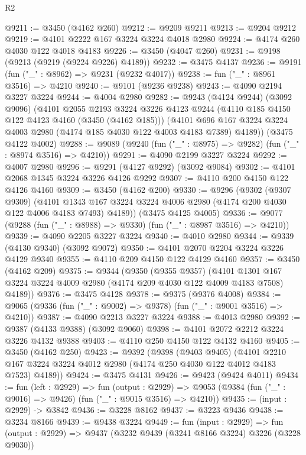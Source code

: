 \begin{lexlean}{R2}
\begin{coremodule}
@9211 := @3450 (@4162 @260)
@9212 := @9209 @9211
@9213 := @9204 @9212
@9219 := @4101 @2222 @167 @3224 @3224 @4018 @2980
@9224 := @4174 @260 @4030 @122 @4018 @4183
@9226 := @3450 (@4047 @260)
@9231 := @9198 (@9213 (@9219 (@9224 @9226) @4189))
@9232 := @3475 @4137
@9236 := @9191 (fun ("_" : @8962) => @9231 (@9232 @4017))
@9238 := fun ("_" : @8961 @3516) => @4210
@9240 := @9101 (@9236 @9238)
@9243 := @4090 @2194 @3227 @3224
@9244 := @4004 @2980
@9282 := @9243
    (@4124 @9244)
    (@3092 @9096)
    (@4101
      @2055
      @2193
      @3224
      @3226
      @4123
      @9244
      (@4110 @185 @4150 @122 @4123 @4160 (@3450 (@4162 @185)))
      (@4101 @696 @167 @3224 @3224 @4003 @2980 (@4174 @185 @4030 @122 @4003 @4183 @7389) @4189))
    (@3475 @4122 @4002)
@9288 := @9089 (@9240 (fun ("_" : @8975) => @9282) (fun ("_" : @8974 @3516) => @4210))
@9291 := @4090 @2199 @3227 @3224
@9292 := @4007 @2980
@9296 := @9291 (@4127 @9292) (@3092 @9084)
@9302 := @4101 @2068 @1345 @3224 @3226 @4126 @9292
@9307 := @4110 @200 @4150 @122 @4126 @4160
@9309 := @3450 (@4162 @200)
@9330 := @9296
    (@9302
      (@9307 @9309)
      (@4101 @1343 @167 @3224 @3224 @4006 @2980 (@4174 @200 @4030 @122 @4006 @4183 @7493) @4189))
    (@3475 @4125 @4005)
@9336 := @9077 (@9288 (fun ("_" : @8988) => @9330) (fun ("_" : @8987 @3516) => @4210))
@9339 := @4090 @2205 @3227 @3224
@9340 := @4010 @2980
@9344 := @9339 (@4130 @9340) (@3092 @9072)
@9350 := @4101 @2070 @2204 @3224 @3226 @4129 @9340
@9355 := @4110 @209 @4150 @122 @4129 @4160
@9357 := @3450 (@4162 @209)
@9375 := @9344
    (@9350
      (@9355 @9357)
      (@4101 @1301 @167 @3224 @3224 @4009 @2980 (@4174 @209 @4030 @122 @4009 @4183 @7508) @4189))
@9376 := @3475 @4128
@9378 := @9375 (@9376 @4008)
@9384 := @9065 (@9336 (fun ("_" : @9002) => @9378) (fun ("_" : @9001 @3516) => @4210))
@9387 := @4090 @2213 @3227 @3224
@9388 := @4013 @2980
@9392 := @9387 (@4133 @9388) (@3092 @9060)
@9398 := @4101 @2072 @2212 @3224 @3226 @4132 @9388
@9403 := @4110 @250 @4150 @122 @4132 @4160
@9405 := @3450 (@4162 @250)
@9423 := @9392
    (@9398
      (@9403 @9405)
      (@4101 @2210 @167 @3224 @3224 @4012 @2980 (@4174 @250 @4030 @122 @4012 @4183 @7523) @4189))
@9424 := @3475 @4131
@9426 := @9423 (@9424 @4011)
@9434 := fun (left : @2929) =>
  fun (output : @2929) =>
  @9053 (@9384 (fun ("_" : @9016) => @9426) (fun ("_" : @9015 @3516) => @4210))
@9435 := (input : @2929) -> @3842
@9436 := @3228 @8162
@9437 := @3223 @9436
@9438 := @3234 @8166
@9439 := @9438 @3224
@9449 := fun (input : @2929) =>
  fun (output : @2929) => @9437 (@3232 @9439 (@3241 @8166 @3224) @3226 (@3228 @9030))

\end{coremodule}
\end{lexlean}
